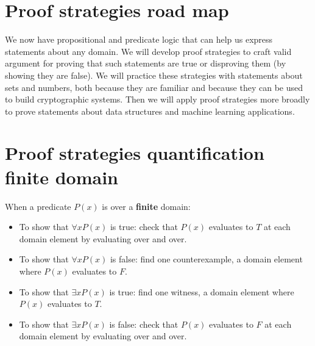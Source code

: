 \documentclass[12pt, oneside]{article}
\begin{document}
 \vfill
\section*{Proof strategies road map}


We now have propositional and predicate logic that can help us express 
statements about any domain. We will develop proof strategies to 
craft valid argument for proving that such statements are true or disproving
them (by showing they are false). We will practice these strategies with 
statements about sets and numbers, both because they are familiar and because they
can be used to build cryptographic systems. Then we will apply proof strategies
more broadly to prove statements about data structures and machine learning 
applications. \vfill
\section*{Proof strategies quantification finite domain}


When a predicate $P(x)$ is over a {\bf finite} domain:
\begin{itemize}
\item To show that $\forall x  P(x)$ is true: check that $P(x)$ evaluates to $T$ at each domain element by evaluating over and over.
\item To show that $\forall x  P(x)$ is false: find one counterexample, a domain element where $P(x)$ evaluates to $F$.
\item To show that $\exists x  P(x)$ is true: find one witness, a domain element where $P(x)$ evaluates to $T$.
\item To show that $\exists x  P(x)$ is false: check that $P(x)$ evaluates to $F$ at each domain element by evaluating over and over.
\end{itemize} \vfill
\end{document}

